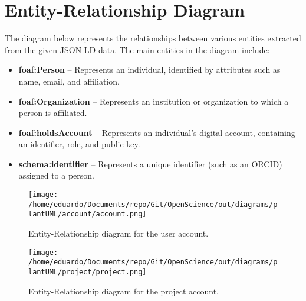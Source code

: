 \documentclass{article}
\begin{document}
    \section{Entity-Relationship Diagram}

    The diagram below represents the relationships between various entities extracted from the given JSON-LD data. The main entities in the diagram include:
    
    \begin{itemize}
        \item \textbf{foaf:Person} – Represents an individual, identified by attributes such as name, email, and affiliation.
        \item \textbf{foaf:Organization} – Represents an institution or organization to which a person is affiliated.
        \item \textbf{foaf:holdsAccount} – Represents an individual's digital account, containing an identifier, role, and public key.
        \item \textbf{schema:identifier} – Represents a unique identifier (such as an ORCID) assigned to a person.
    \end{itemize}
    
    
    \vspace{1cm}
    
    \begin{figure}[H]
        \centering
        \texttt{[image: /home/eduardo/Documents/repo/Git/OpenScience/out/diagrams/plantUML/account/account.png]}  %
        \caption{Entity-Relationship diagram for the user account.}
        \label{fig:er-diagram}
    \end{figure}

   
    \vspace{1cm}
    
    \begin{figure}[H]
        \centering
        \texttt{[image: /home/eduardo/Documents/repo/Git/OpenScience/out/diagrams/plantUML/project/project.png]}  %
        \caption{Entity-Relationship diagram for the project account.}
        \label{fig:er-diagram}
    \end{figure}
    
    
    
\end{document}
